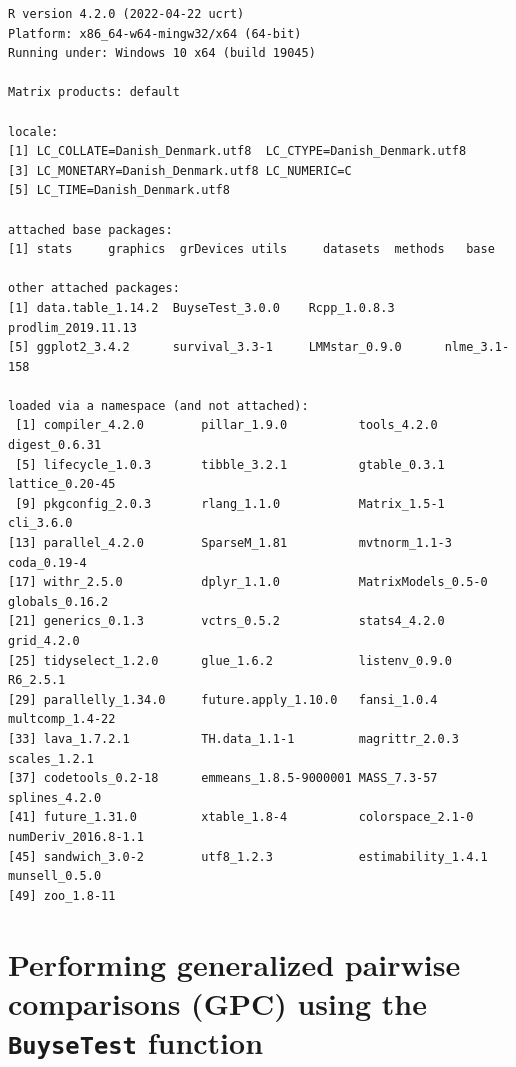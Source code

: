 \documentclass[12pt]{article}
\begin{document}
\begin{verbatim}
R version 4.2.0 (2022-04-22 ucrt)
Platform: x86_64-w64-mingw32/x64 (64-bit)
Running under: Windows 10 x64 (build 19045)

Matrix products: default

locale:
[1] LC_COLLATE=Danish_Denmark.utf8  LC_CTYPE=Danish_Denmark.utf8   
[3] LC_MONETARY=Danish_Denmark.utf8 LC_NUMERIC=C                   
[5] LC_TIME=Danish_Denmark.utf8    

attached base packages:
[1] stats     graphics  grDevices utils     datasets  methods   base     

other attached packages:
[1] data.table_1.14.2  BuyseTest_3.0.0    Rcpp_1.0.8.3       prodlim_2019.11.13
[5] ggplot2_3.4.2      survival_3.3-1     LMMstar_0.9.0      nlme_3.1-158      

loaded via a namespace (and not attached):
 [1] compiler_4.2.0        pillar_1.9.0          tools_4.2.0           digest_0.6.31        
 [5] lifecycle_1.0.3       tibble_3.2.1          gtable_0.3.1          lattice_0.20-45      
 [9] pkgconfig_2.0.3       rlang_1.1.0           Matrix_1.5-1          cli_3.6.0            
[13] parallel_4.2.0        SparseM_1.81          mvtnorm_1.1-3         coda_0.19-4          
[17] withr_2.5.0           dplyr_1.1.0           MatrixModels_0.5-0    globals_0.16.2       
[21] generics_0.1.3        vctrs_0.5.2           stats4_4.2.0          grid_4.2.0           
[25] tidyselect_1.2.0      glue_1.6.2            listenv_0.9.0         R6_2.5.1             
[29] parallelly_1.34.0     future.apply_1.10.0   fansi_1.0.4           multcomp_1.4-22      
[33] lava_1.7.2.1          TH.data_1.1-1         magrittr_2.0.3        scales_1.2.1         
[37] codetools_0.2-18      emmeans_1.8.5-9000001 MASS_7.3-57           splines_4.2.0        
[41] future_1.31.0         xtable_1.8-4          colorspace_2.1-0      numDeriv_2016.8-1.1  
[45] sandwich_3.0-2        utf8_1.2.3            estimability_1.4.1    munsell_0.5.0        
[49] zoo_1.8-11
\end{verbatim}

\clearpage

\section{Performing generalized pairwise comparisons (GPC) using the \texttt{BuyseTest} function}
\label{sec:org2e3f7ab}
\end{document}

